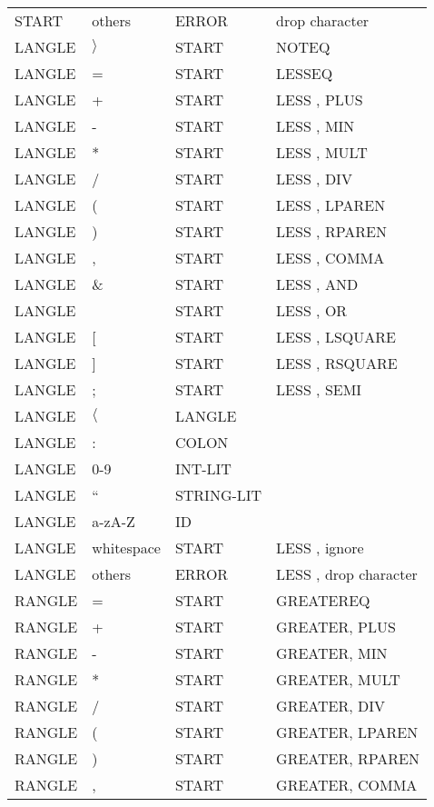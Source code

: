 \documentclass[11pt, fleqn]{article}
\begin{document}
\begin{longtable}{l|l|l|l}
START			&	others							&	ERROR			&	drop character		\\
LANGLE			&	$\rangle$						&	START			&	NOTEQ				\\
LANGLE			&	=								&	START			&	LESSEQ				\\
LANGLE			&	+								&	START			&	LESS	, PLUS			\\
LANGLE			&	-								&	START			&	LESS	, MIN			\\
LANGLE			&	*								&	START			&	LESS	, MULT			\\
LANGLE			&	/								&	START			&	LESS	, DIV			\\
LANGLE			&	(								&	START			&	LESS	, LPAREN			\\
LANGLE			&	)								&	START			&	LESS	, RPAREN			\\
LANGLE			&	,								&	START			&	LESS	, COMMA			\\
LANGLE			&	\&								&	START			&	LESS	, AND			\\
LANGLE			&	\textbar							&	START			&	LESS	, OR				\\
LANGLE			&	[								&	START			&	LESS	, LSQUARE		\\
LANGLE			&	]								&	START			&	LESS	, RSQUARE		\\
LANGLE			&	;								&	START			&	LESS	, SEMI			\\
LANGLE			&	$\langle$						&	LANGLE			&						\\
LANGLE			&	:								&	COLON			&						\\
LANGLE			&	0-9								&	INT-LIT			&						\\
LANGLE			&	``								&	STRING-LIT		&						\\
LANGLE			&	a-zA-Z							&	ID				&						\\
LANGLE			&	whitespace						&	START			&	LESS	, ignore			\\
LANGLE			&	others							&	ERROR			&	LESS	, drop character	\\
RANGLE			&	=								&	START			&	GREATEREQ			\\
RANGLE			&	+								&	START			&	GREATER, PLUS		\\
RANGLE			&	-								&	START			&	GREATER, MIN			\\
RANGLE			&	*								&	START			&	GREATER, MULT		\\
RANGLE			&	/								&	START			&	GREATER, DIV			\\
RANGLE			&	(								&	START			&	GREATER, LPAREN		\\
RANGLE			&	)								&	START			&	GREATER, RPAREN		\\
RANGLE			&	,								&	START			&	GREATER, COMMA		\\

\end{longtable}
\end{document}
